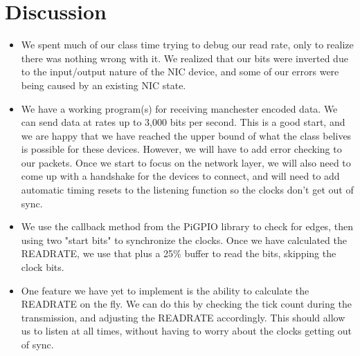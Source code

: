 \documentclass{article}
\begin{document}
\section*{Discussion}
\begin{itemize}
    \item We spent much of our class time trying to debug our read rate, only to realize there was nothing wrong with it. We realized
    that our bits were inverted due to the input/output nature of the NIC device, and some of our errors were being caused by an existing NIC state.
    \item We have a working program(s) for receiving manchester encoded data. We can send data at rates up to 3,000 bits per second. 
    This is a good start, and we are happy that we have reached the upper bound of what the class belives is possible for these devices.
    However, we will have to add error checking to our packets. Once we start to focus on the network layer, we will also need to come up with a 
    handshake for the devices to connect, and will need to add automatic timing resets to the listening function so the clocks don't get out of sync. 
    \item We use the callback method from the PiGPIO library to check for edges, then using two "start bits" to synchronize the clocks. 
    Once we have calculated the READRATE, we use that plus a 25\% buffer to read the bits, skipping the clock bits. 
    \item One feature we have yet to implement is the ability to calculate the READRATE on the fly. We can do this
    by checking the tick count during the transmission, and adjusting the READRATE accordingly. This should allow us to listen at all times, 
    without having to worry about the clocks getting out of sync.
\end{itemize}

\end{document}
